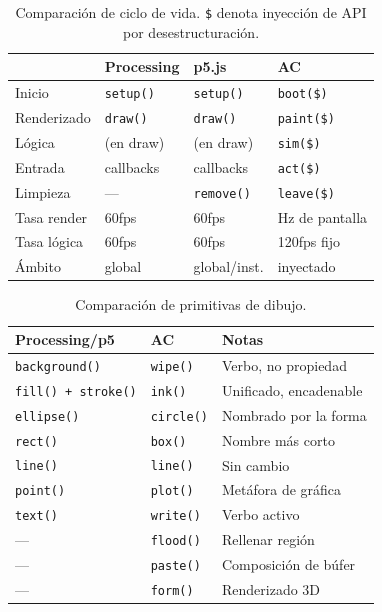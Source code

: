 \documentclass[10pt,letterpaper,twocolumn]{article}
\begin{document}
\begin{table}[h]
\small
\centering
\begin{tabularx}{\columnwidth}{lXXX}
\toprule
 & \textbf{Processing} & \textbf{p5.js} & \textbf{AC} \\
\midrule
Inicio & \texttt{setup()} & \texttt{setup()} & \texttt{boot(\$)} \\
Renderizado & \texttt{draw()} & \texttt{draw()} & \texttt{paint(\$)} \\
Lógica & (en draw) & (en draw) & \texttt{sim(\$)} \\
Entrada & callbacks & callbacks & \texttt{act(\$)} \\
Limpieza & --- & \texttt{remove()} & \texttt{leave(\$)} \\
\midrule
Tasa render & 60fps & 60fps & Hz de pantalla \\
Tasa lógica & 60fps & 60fps & 120fps fijo \\
Ámbito & global & global/inst. & inyectado \\
\bottomrule
\end{tabularx}
\caption{Comparación de ciclo de vida. \texttt{\$} denota inyección de API por desestructuración.}
\label{tab:lifecycle}
\end{table}

\begin{table}[h]
\small
\centering
\begin{tabularx}{\columnwidth}{lXX}
\toprule
\textbf{Processing/p5} & \textbf{AC} & \textbf{Notas} \\
\midrule
\texttt{background()} & \texttt{wipe()} & Verbo, no propiedad \\
\texttt{fill() + stroke()} & \texttt{ink()} & Unificado, encadenable \\
\texttt{ellipse()} & \texttt{circle()} & Nombrado por la forma \\
\texttt{rect()} & \texttt{box()} & Nombre más corto \\
\texttt{line()} & \texttt{line()} & Sin cambio \\
\texttt{point()} & \texttt{plot()} & Metáfora de gráfica \\
\texttt{text()} & \texttt{write()} & Verbo activo \\
--- & \texttt{flood()} & Rellenar región \\
--- & \texttt{paste()} & Composición de búfer \\
--- & \texttt{form()} & Renderizado 3D \\
\bottomrule
\end{tabularx}
\caption{Comparación de primitivas de dibujo.}
\label{tab:drawing}
\end{table}
\end{document}
